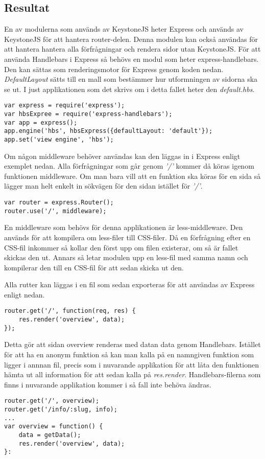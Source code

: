 \subsection{Resultat}
En av modulerna som används av KeystoneJS heter Express och används av KeystoneJS för att hantera router-delen. Denna modulen kan också användas för att hantera hantera  alla förfrågningar \cite{expressRouter} och rendera sidor utan KeystoneJS. För att använda Handlebars i Express så behövs en modul som heter express-handlebars. Den kan sättas som renderingsmotor för Express genom koden nedan. \textit{DefaultLayout} sätts till en mall som bestämmer hur utformningen av sidorna ska se ut. I just applikationen som det skrivs om i detta fallet heter den \textit{default.hbs}. 
\begin{verbatim}
var express = require('express');
var hbsExpree = require('express-handlebars');
var app = express();
app.engine('hbs', hbsExpress({defaultLayout: 'default'});
app.set('view engine', 'hbs');
\end{verbatim}

Om någon middleware behöver användas kan den läggas in i Express enligt exemplet nedan. Alla förfrågningar som går genom \textit{'/'} kommer då köras igenom funktionen middleware. Om man bara vill att en funktion ska köras för en sida så lägger man helt enkelt in sökvägen för den sidan istället för \textit{'/'}. 
\begin{verbatim}
var router = express.Router();
router.use('/', middleware);
\end{verbatim}
En middleware som behövs för denna applikationen är less-middleware. Den används för att kompilera om less-filer till CSS-filer. Då en förfrågning efter en CSS-fil inkommer så kollar den först upp om filen existerar, om så är fallet skickas den ut. Annars så letar modulen upp en less-fil med samma namn och kompilerar den till en CSS-fil för att sedan skicka ut den. 

Alla rutter kan läggas i en fil som sedan exporteras för att användas av Express enligt nedan. 
\begin{verbatim}
router.get('/', function(req, res) {
	res.render('overview', data);
});

\end{verbatim}
Detta gör att sidan overview renderas med datan data genom Handlebars. Istället för att ha en anonym funktion så kan man kalla på en namngiven funktion som ligger i annnan fil, precis som i nuvarande applikation för att låta den funktionen hämta ut all information för att sedan kalla på \textit{res.render}. Handlebars-filerna som finns i nuvarande applikation kommer i så fall inte behöva ändras. 
\begin{verbatim}
router.get('/', overview);
router.get('/info/:slug, info);
...
var overview = function() {
	data = getData();
	res.render('overview', data);
}:
\end{verbatim} 

